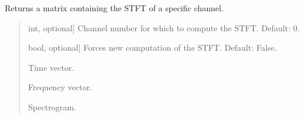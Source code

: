 \documentclass[letterpaper,10pt,english]{sphinxmanual}
\begin{document}
\begin{fulllineitems}
\begin{fulllineitems}
\label{\detokenize{classes:dsptools.classes.signal_class.Signal.get_spectrogram}}
\pysigstartsignatures
{}
\pysigstopsignatures
\sphinxAtStartPar
Returns a matrix containing the STFT of a specific channel.
\begin{quote}\begin{description}
\begin{description}
\sphinxlineitem{\sphinxstylestrong{channel\_number}}{[}int, optional{]}
\sphinxAtStartPar
Channel number for which to compute the STFT. Default: 0.

\sphinxlineitem{\sphinxstylestrong{force\_computation}}{[}bool, optional{]}
\sphinxAtStartPar
Forces new computation of the STFT. Default: False.

\end{description}

\begin{description}
\sphinxlineitem{\sphinxstylestrong{t\_s}}{[}\sphinxtitleref{np.ndarray}{]}
\sphinxAtStartPar
Time vector.

\sphinxlineitem{\sphinxstylestrong{f\_hz}}{[}\sphinxtitleref{np.ndarray}{]}
\sphinxAtStartPar
Frequency vector.

\sphinxlineitem{\sphinxstylestrong{spectrogram}}{[}\sphinxtitleref{np.ndarray}{]}
\sphinxAtStartPar
Spectrogram.

\end{description}

\end{description}\end{quote}

\end{fulllineitems}



\end{fulllineitems}
\end{document}
